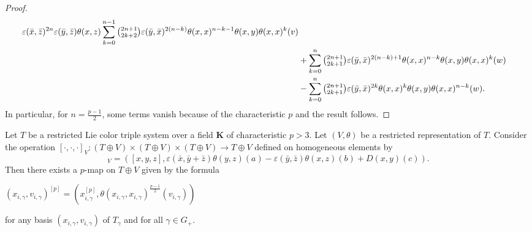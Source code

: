\documentclass[11pt, twoside]{article}
\begin{document}
\begin{proof}
\begin{align*}
\varepsilon(\bar{x},\bar{z})^{2n}\varepsilon(\bar{y},\bar{z})\theta(x,z)\sum\limits_{k=0}^{n-1}\tbinom{2n+1}{2k+2}\varepsilon(\bar{y},\bar{x})^{2(n-k)}\theta(x,x)^{n-k-1}\theta(x,y)\theta(x,x)^k(v) \\ & +\sum\limits_{k=0}^n \tbinom{2n+1}{2k+1}\varepsilon(\bar{y},\bar{x})^{2(n-k)+1}\theta(x,x)^{n-k}\theta(x,y)\theta(x,x)^k(w) \\ & -\sum\limits_{k=0}^n \tbinom{2n+1}{2k+1}\varepsilon(\bar{y},\bar{x})^{2k}\theta(x,x)^{k}\theta(x,y)\theta(x,x)^{n-k}(w).
    \end{align*} In particular, for $n=\frac{p-1}{2}$, some terms vanish because of the characteristic $p$ and the result follows.
\end{proof}

\begin{thm}\label{thm5.18}
     Let $T$ be a restricted Lie color triple system over a field $\mathbf{K} $ of characteristic $p>3 $. Let $(V,\theta)$ be a restricted representation of $T$. Consider the operation $[\cdot,\cdot,\cdot]_V: (T\oplus V)\times (T\oplus V)\times (T\oplus V)\to T\oplus V  $ defined on homogeneous elements by 
        \begin{equation*}[(x,a),(y,b),(z,c)]_V=([x,y,z], \varepsilon(\bar{x},\bar{y}+\bar{z})\theta(y,z)(a)-\varepsilon(\bar{y},\bar{z})\theta(x,z)(b)+ D(x,y)(c)). \end{equation*}
     Then there exists a $p$-map on $T\oplus V$ given by the formula \begin{center}
        $(x_{i,\gamma},v_{i,\gamma})^{[p]}=(x_{i,\gamma}^{[p]},\theta(x_{i,\gamma},x_{i,\gamma})^{\frac{p-1}{2}}(v_{i,\gamma}))$
    \end{center} for any basis $(x_{i,\gamma},v_{i,\gamma}) $ of $T_\gamma $ and for all $\gamma\in G_+ $.
\end{thm}
\end{document}
